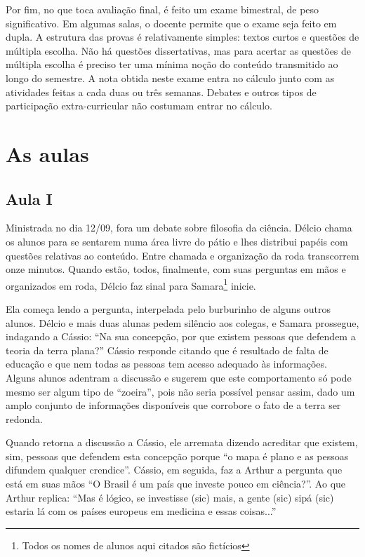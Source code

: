 \documentclass[12pt,a4paper]{article}
\begin{document}
    Por fim, no que toca avaliação final, é feito um exame bimestral, de 
    peso significativo. Em algumas salas, o docente permite que o exame seja 
    feito em dupla. A estrutura das provas é relativamente simples: textos 
    curtos e questões de múltipla escolha. Não há questões dissertativas, 
    mas para acertar as questões de múltipla escolha é preciso ter uma mínima 
    noção do conteúdo transmitido ao longo do semestre. A nota obtida neste 
    exame entra no cálculo junto com as atividades feitas a cada duas ou 
    três semanas. Debates e outros tipos de participação extra-curricular 
    não costumam entrar no cálculo. 
    	
	\newpage
	
	\section{As aulas}

    \subsection*{Aula I}
    
    Ministrada no dia 12/09, fora um debate sobre filosofia da ciência. Délcio 
    chama os alunos para se sentarem numa área livre do pátio e lhes distribui 
    papéis com questões relativas ao conteúdo. Entre chamada e organização da 
    roda transcorrem onze minutos. Quando estão, todos, finalmente, com suas 
    perguntas em mãos e organizados em roda, Délcio faz sinal para 
    Samara\footnote{Todos os nomes de alunos aqui citados são fictícios} 
    inicie. 
    
    Ela começa lendo a pergunta, interpelada pelo burburinho de alguns 
    outros alunos. Délcio e mais duas alunas pedem silêncio aos colegas, e 
    Samara prossegue, indagando a Cássio: ``Na sua concepção, por que existem 
    pessoas que defendem a teoria da terra plana?'' Cássio responde citando 
    que é resultado de falta de educação e que nem todas as pessoas tem acesso 
    adequado às informações. Alguns alunos adentram a discussão e sugerem que 
    este comportamento só pode mesmo ser algum tipo de ``zoeira'', pois não 
    seria possível pensar assim, dado um amplo conjunto de informações 
    disponíveis que corrobore o fato de a terra ser redonda. 
    
    Quando retorna a discussão a Cássio, ele arremata dizendo acreditar que 
    existem, sim, pessoas que defendem esta concepção porque ``o mapa é plano 
    e as pessoas difundem qualquer crendice''. Cássio, em seguida, faz a 
    Arthur a pergunta que está em suas mãos ``O Brasil é um país que 
    investe pouco em ciência?''. Ao que Arthur replica: ``Mas é lógico, 
    se investisse (sic) mais, a gente (sic) sipá (sic) estaria lá com os 
    países europeus em medicina e essas coisas...'' 
    
\end{document}
